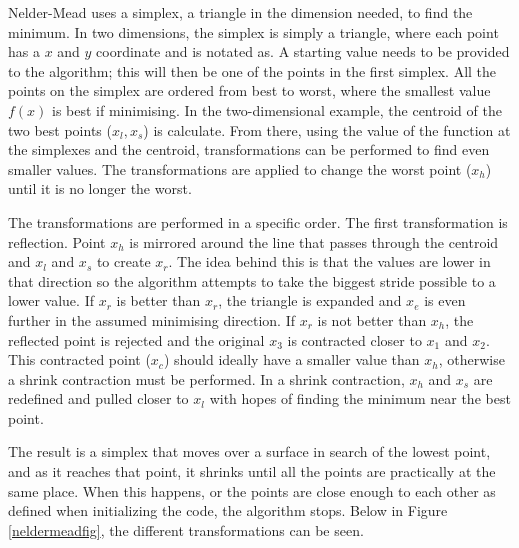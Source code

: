 Nelder-Mead uses a simplex, a triangle in the dimension needed, to find the minimum.
In two dimensions, the simplex is simply a triangle, where each point has a $x$ and $y$ coordinate and is notated as. 
A starting value needs to be provided to the algorithm; this will then be one of the points in the first simplex.
All the points on the simplex are ordered from best to worst, where the smallest value $f (x)$ is best if minimising.
In the two-dimensional example, the centroid of the two best points  ($x_l,x_s$) is calculate.
From there, using the value of the function at the simplexes and the centroid, transformations can be performed to find even smaller values.
The transformations are applied to change the worst point  ($x_h$) until it is no longer the worst.

The transformations are performed in a specific order.
The first transformation is reflection.
Point $x_h$ is mirrored around the line that passes through the centroid and $x_l$ and $x_s$ to create $x_r$.
The idea behind this is that the values are lower in that direction so the algorithm attempts to take the biggest stride possible to a lower value.
If $x_r$ is better than $x_r$,  the triangle is expanded and $x_e$ is even further in the assumed minimising direction.
If $x_r$ is not better than $x_h$, the reflected point is rejected and the original $x_3$ is contracted closer to $x_1$ and $x_2$.
This contracted point ($x_c$) should ideally have a smaller value than $x_h$, otherwise a shrink contraction must be performed.
In a shrink contraction, $x_h$ and $x_s$ are redefined and pulled closer to $x_l$ with hopes of finding the minimum near the best point.

The result is a simplex that moves over a surface in search of the lowest point, and as it reaches that point, it shrinks until all the points are practically at the same place. When this happens, or the points are close enough to each other as defined when initializing the code, the algorithm stops. Below in Figure \ref{neldermeadfig}, the different transformations can be seen.

